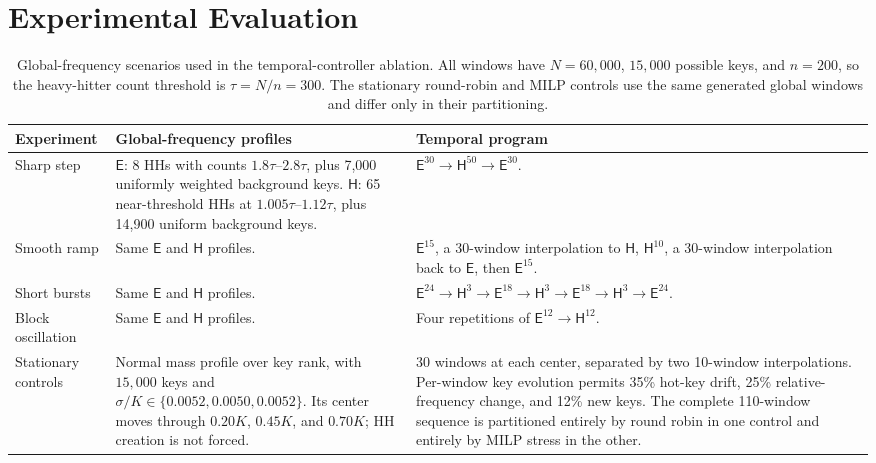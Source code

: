 \documentclass[sigconf, nonacm]{acmart}
\begin{document}
\section{Experimental Evaluation}
\label{sec:experiments}

\begin{table}[b]
\caption{Global-frequency scenarios used in the temporal-controller ablation.
All windows have \(N=60{,}000\), \(15{,}000\) possible keys, and \(n=200\), so
the heavy-hitter count threshold is \(\tau=N/n=300\). The stationary
round-robin and MILP controls use the same generated global windows and differ
only in their partitioning.}
\label{tab:temporal-global-scenarios}
\centering
\small
\begin{tabularx}{\textwidth}{@{}p{}p{}X@{}}
\toprule
Experiment & Global-frequency profiles & Temporal program \\
\midrule
Sharp step
& \(\mathsf{E}\): 8 HHs with counts \(1.8\tau\)--\(2.8\tau\), plus 7,000 uniformly weighted background keys.
  \(\mathsf{H}\): 65 near-threshold HHs at \(1.005\tau\)--\(1.12\tau\), plus 14,900 uniform background keys.
& \(\mathsf{E}^{30}\rightarrow\mathsf{H}^{50}\rightarrow\mathsf{E}^{30}\). \\
\addlinespace
Smooth ramp
& Same \(\mathsf{E}\) and \(\mathsf{H}\) profiles.
& \(\mathsf{E}^{15}\), a 30-window interpolation to \(\mathsf{H}\),
  \(\mathsf{H}^{10}\), a 30-window interpolation back to \(\mathsf{E}\), then
  \(\mathsf{E}^{15}\). \\
\addlinespace
Short bursts
& Same \(\mathsf{E}\) and \(\mathsf{H}\) profiles.
& \(\mathsf{E}^{24}\rightarrow\mathsf{H}^{3}\rightarrow
  \mathsf{E}^{18}\rightarrow\mathsf{H}^{3}\rightarrow
  \mathsf{E}^{18}\rightarrow\mathsf{H}^{3}\rightarrow\mathsf{E}^{24}\). \\
\addlinespace
Block oscillation
& Same \(\mathsf{E}\) and \(\mathsf{H}\) profiles.
& Four repetitions of \(\mathsf{E}^{12}\rightarrow\mathsf{H}^{12}\). \\
\midrule
Stationary controls
& Normal mass profile over key rank, with \(15{,}000\) keys and
  \(\sigma/K\in\{0.0052,0.0050,0.0052\}\). Its center moves through
  \(0.20K\), \(0.45K\), and \(0.70K\); HH creation is not forced.
& 30 windows at each center, separated by two 10-window interpolations.
  Per-window key evolution permits 35\% hot-key drift, 25\% relative-frequency
  change, and 12\% new keys. The complete 110-window sequence is partitioned
  entirely by round robin in one control and entirely by MILP stress in the
  other. \\
\bottomrule
\end{tabularx}
\end{table}
\end{document}
